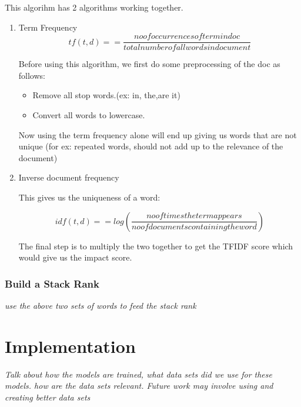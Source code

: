 \documentclass{article}
\begin{document}
This algorihm has 2 algorithms working together.
\begin{enumerate}
\item {Term Frequency}
\[tf(t,d) =  = \frac{no of occurrences of term in doc }{total number of all words in document}\]


Before using this algorithm, we first do some preprocessing of the doc as follows:
\begin{itemize}
\item {Remove all stop words.(ex: in, the,are it)}
\item {Convert all words to lowercase.}
\end {itemize}
Now using the term frequency alone will end up giving us words that are not unique (for ex: repeated words, should not add up to the relevance of the document)

\item Inverse document frequency

 This gives us the uniqueness of a word:

 \[idf(t,d) =  = log(\frac{no of times the term appears }{no of documents containing the word})\]

The final step is to multiply the two together to get the TFIDF score which would give us the impact score.
\end{enumerate}

\subsubsection {Build a Stack Rank}
\textit {use the above two sets of words to feed the stack rank}

\maketitle
\section{Implementation} %
 \textit{Talk about how the models are trained, what data sets did we use for these models. how are the data sets relevant. Future work may involve using and creating better data sets}

 \maketitle
\end{document}
